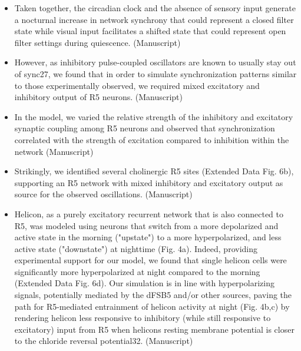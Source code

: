 \documentclass[11pt]{article}
\begin{document}
\begin{itemize}
    \item  Taken together, the circadian clock and the absence of sensory
    input generate a nocturnal increase in network synchrony that could represent a closed filter
    state while visual input facilitates a shifted state that could represent open filter settings
    during quiescence.
    \cite{raccugliaCoherentMultilevelNetwork2022} (Manuscript)

    \item However, as inhibitory pulse-coupled
    oscillators are known to usually stay out of sync27, we found that in order to simulate
    synchronization patterns similar to those experimentally observed, we required mixed
    excitatory and inhibitory output of R5 neurons.
    \cite{raccugliaCoherentMultilevelNetwork2022} (Manuscript)

    \item In the model, we
    varied the relative strength of the inhibitory and excitatory synaptic coupling among R5
    neurons and observed that synchronization correlated with the strength of excitation
    compared to inhibition within the network
    \cite{raccugliaCoherentMultilevelNetwork2022} (Manuscript)

    \item Strikingly, we identified several cholinergic R5 sites (Extended Data Fig. 6b), supporting an R5
    network with mixed inhibitory and excitatory output as source for the observed oscillations.
    \cite{raccugliaCoherentMultilevelNetwork2022} (Manuscript)

    \item Helicon, as a purely excitatory recurrent network
    that is also connected to R5, was modeled using neurons that switch from a more depolarized
    and active state in the morning ("upstate") to a more hyperpolarized, and less active state
    ("downstate") at nighttime (Fig. 4a). Indeed, providing experimental support for our model,
    we found that single helicon cells were significantly more hyperpolarized at night compared
    to the morning (Extended Data Fig. 6d). Our simulation is in line with hyperpolarizing signals,
    potentially mediated by the dFSB5 and/or other sources, paving the path for R5-mediated
    entrainment of helicon activity at night (Fig. 4b,c) by rendering helicon less responsive to
    inhibitory (while still responsive to excitatory) input from R5 when helicons resting membrane
    potential is closer to the chloride reversal potential32. 
    \cite{raccugliaCoherentMultilevelNetwork2022} (Manuscript)


\end{itemize}
\end{document}
